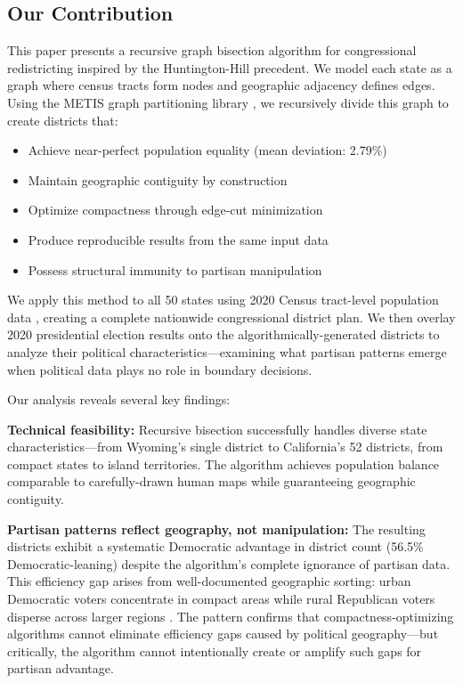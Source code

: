 \subsection{Our Contribution}

This paper presents a recursive graph bisection algorithm for congressional redistricting inspired by the Huntington-Hill precedent. We model each state as a graph where census tracts form nodes and geographic adjacency defines edges. Using the METIS graph partitioning library \cite{karypis1998fast}, we recursively divide this graph to create districts that:

\begin{itemize}
    \item Achieve near-perfect population equality (mean deviation: 2.79\%)
    \item Maintain geographic contiguity by construction
    \item Optimize compactness through edge-cut minimization
    \item Produce reproducible results from the same input data
    \item Possess structural immunity to partisan manipulation
\end{itemize}

We apply this method to all 50 states using 2020 Census tract-level population data \cite{census2020redistricting}, creating a complete nationwide congressional district plan. We then overlay 2020 presidential election results \cite{medsl2020} onto the algorithmically-generated districts to analyze their political characteristics—examining what partisan patterns emerge when political data plays no role in boundary decisions.

Our analysis reveals several key findings:

\textbf{Technical feasibility:} Recursive bisection successfully handles diverse state characteristics—from Wyoming's single district to California's 52 districts, from compact states to island territories. The algorithm achieves population balance comparable to carefully-drawn human maps while guaranteeing geographic contiguity.

\textbf{Partisan patterns reflect geography, not manipulation:} The resulting districts exhibit a systematic Democratic advantage in district count (56.5\% Democratic-leaning) despite the algorithm's complete ignorance of partisan data. This efficiency gap arises from well-documented geographic sorting: urban Democratic voters concentrate in compact areas while rural Republican voters disperse across larger regions \cite{chen2013unintentional,rodden2019why}. The pattern confirms that compactness-optimizing algorithms cannot eliminate efficiency gaps caused by political geography—but critically, the algorithm cannot intentionally create or amplify such gaps for partisan advantage.

